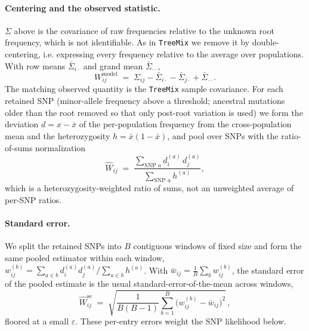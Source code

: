 \documentclass[12pt]{article}
\theoremstyle{definition}
\theoremstyle{definition}
\theoremstyle{lemma}
\theoremstyle{remark}
\theoremstyle{definition}
\begin{document}
\paragraph{Centering and the observed statistic.}
$\Sigma$ above is the covariance of raw frequencies relative to the unknown root
frequency, which is not identifiable. As in \texttt{TreeMix} we remove it by
double-centering, i.e. expressing every frequency relative to the average over
populations. With row means $\bar\Sigma_{i\cdot}$ and grand mean
$\bar\Sigma_{\cdot\cdot}$,
\[
  W^{\text{model}}_{ij} \;=\; \Sigma_{ij} - \bar\Sigma_{i\cdot}
  - \bar\Sigma_{j\cdot} + \bar\Sigma_{\cdot\cdot}.
\]
The matching observed quantity is the \texttt{TreeMix} sample covariance. For each
retained SNP (minor-allele frequency above a threshold; ancestral mutations older
than the root removed so that only post-root variation is used) we form the
deviation $d = x - \bar x$ of the per-population frequency from the cross-population
mean and the heterozygosity $h = \bar x(1-\bar x)$, and pool over SNPs with the
ratio-of-sums normalization
\[
  \hat W_{ij} \;=\; \frac{\sum_{\text{SNP } a} d^{(a)}_i\, d^{(a)}_j}
  {\sum_{\text{SNP } a} h^{(a)}},
\]
which is a heterozygosity-weighted ratio of sums, not an unweighted average of
per-SNP ratios.

\paragraph{Standard error.}
We split the retained SNPs into $B$ contiguous windows of fixed size and form the
same pooled estimator within each window, $w^{(b)}_{ij}=\sum_{a\in
b}d^{(a)}_id^{(a)}_j/\sum_{a\in b}h^{(a)}$. With $\bar w_{ij}=\tfrac1B\sum_b
w^{(b)}_{ij}$, the standard error of the pooled estimate is the usual
standard-error-of-the-mean across windows,
\[
  \hat W^{\text{se}}_{ij}
  \;=\; \sqrt{\frac{1}{B(B-1)}\sum_{b=1}^{B}\big(w^{(b)}_{ij}-\bar w_{ij}\big)^2}\, ,
\]
floored at a small $\varepsilon$. These per-entry errors weight the SNP
likelihood below.
\end{document}
